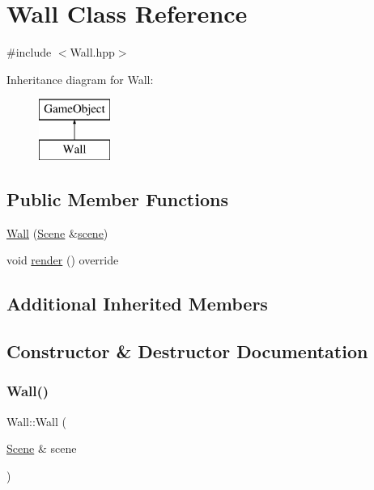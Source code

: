 \hypertarget{class_wall}{}\section{Wall Class Reference}
\label{class_wall}


{\ttfamily \#include $<$Wall.\+hpp$>$}

Inheritance diagram for Wall\+:\begin{figure}[H]
\begin{center}
\leavevmode
\includegraphics[height=2.000000cm]{class_wall}
\end{center}
\end{figure}
\subsection*{Public Member Functions}
\begin{DoxyCompactItemize}
\item 
\mbox{\hyperlink{class_wall_acff230e44e6b7210839291519052bd63}{Wall}} (\mbox{\hyperlink{class_scene}{Scene}} \&\mbox{\hyperlink{class_game_object_aeea61de934e13603696b4ed00e9fe42e}{scene}})
\item 
void \mbox{\hyperlink{class_wall_ad2b19eb994789ac7588b61a7ad0d928f}{render}} () override
\end{DoxyCompactItemize}
\subsection*{Additional Inherited Members}


\subsection{Constructor \& Destructor Documentation}
\mbox{\label{class_wall_acff230e44e6b7210839291519052bd63}} 
\subsubsection{\texorpdfstring{Wall()}{Wall()}}
{\footnotesize\ttfamily Wall\+::\+Wall (\begin{DoxyParamCaption}\item[{\mbox{\hyperlink{class_scene}{Scene}} \&}]{scene }\end{DoxyParamCaption})}



